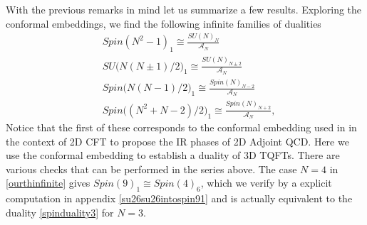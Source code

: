 \documentclass[11pt]{article}
\numberwithin{equation}{section}
\begin{document}
With the previous remarks in mind let us summarize a few results. Exploring the conformal embeddings, we find the following infinite families of dualities
\begin{align}
     & Spin(N^{2}-1)_{1} \cong \frac{SU(N)_{N}}{\mathcal{A}_{N}} \label{firstinfinite} \\[0.4cm]
     & SU \big( N( N \pm 1)/2 \big)_{1} \cong   \frac{SU(N)_{N \pm 2}}{\mathcal{A}_{N}} \label{secondinfinite} \\[0.4cm]
     & Spin\big( N(N-1)/2 \big)_{1}  \cong  \frac{Spin(N)_{N-2}}{\mathcal{A}_{N}} \label{thirdinfinite} \\[0.4cm]
     & Spin\big( (N^{2}+N-2)/2 \big)_{1} \cong  \frac{Spin(N)_{N+2}}{\mathcal{A}_{N}}, \label{ourthinfinite}
\end{align}
Notice that the first of these corresponds to the conformal embedding used in \cite{Komargodski:2020mxz} in the context of 2D CFT to propose the IR phases of 2D Adjoint QCD. Here we use the conformal embedding to establish a duality of 3D TQFTs. There are various checks that can be performed in the series above. The case $N=4$ in \eqref{ourthinfinite} gives $Spin(9)_{1} \cong Spin(4)_{6}$, which we verify by a explicit computation in appendix \ref{su26su26intospin91} and is actually equivalent to the duality \eqref{spinduality3} for $N=3$.
\end{document}
